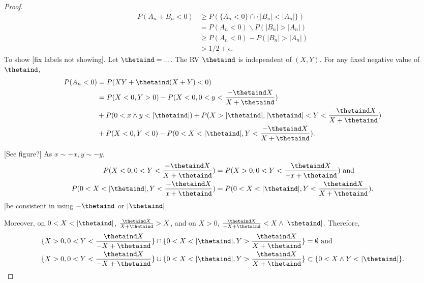 \documentclass[12pt]{article}
\renewcommand{\P}{P}
\newcommand{\A}{A}
\newcommand{\B}{B}
\newcommand{\y}{Y}
\newcommand{\x}{X}
\begin{document}
{\begin{proof}
      \begin{align}
        \P(A_n+B_n < 0) &\ge \P(\{\A_n<0\} \cap \{|B_n|<|A_n|\})\\
                        &=\P(\A_n <0) \backslash \P(|\B_n|>|\A_n|)\\
                        &\ge \P(\A_n<0) - \P(|\B_n|>|\A_n|)\\
                        &> 1/2 + \epsilon.
      \end{align}
      To show  [fix labels not showing]. Let
      $\thetaind=...$. The RV $\thetaind$ is independent of
      $(\x,\y)$. For any fixed negative value of $\thetaind$,
      \begin{align}
        \P(\A_n<0) &= \P(\x\y+\thetaind(\x+\y) < 0)\\
                   &= \P(\x < 0, \y > 0) - \P(\x<0, 0<y<\frac{-\thetaind \x}{\x+\thetaind})\\
                   &+ \P(0 < x \wedge y < |\thetaind|) + \P(\x > |\thetaind|, |\thetaind| < \y < \frac{-\thetaind\x}{\x+\thetaind})\\
                   &+ \P(\x < 0, \y < 0) - \P(0 < \x < |\thetaind|, \y < \frac{-\thetaind\x}{\x+\thetaind}).\label{thrm:sign:Adecomposition}
      \end{align}
      
      [See figure?] As $x\sim -x, y\sim -y$,
      \begin{align}
        \P(\x<0, 0 < \y < \frac{-\thetaind\x}{\x+\thetaind}) &= \P(\x>0, 0 < \y < \frac{\thetaind\x}{-x+\thetaind}) \text{   and    }\\
        \P(0<\x<|\thetaind|, \y < \frac{-\thetaind\x}{x+\thetaind}) &= \P(0 < \x < |\thetaind|, \y < \frac{\thetaind\x}{\x+\thetaind}).
      \end{align}
      [be consistent in using $-\thetaind$ or $|\thetaind|$].

      Moreover, on $0 < \x < |\thetaind|$,
      $\frac{\thetaind\x}{\x+\thetaind} > \x$, and on $\x>0$,
      $\frac{\thetaind\x}{-\x+\thetaind} < \x \wedge |\thetaind|$. Therefore,
      \begin{align}
        \{\x > 0, 0 < \y < \frac{\thetaind\x}{-\x+\thetaind}\} \cap \{0<\x<|\thetaind|, \y>\frac{\thetaind\x}{\x+\thetaind}\} &= \emptyset \text{   and   }\\
        \{\x > 0, 0 < \y < \frac{\thetaind\x}{-\x+\thetaind}\} \cup \{0<\x<|\thetaind|, \y>\frac{\thetaind\x}{\x+\thetaind}\} &\subset \{0< \x\wedge\y < |\thetaind|\}.\label{thrm:sign:switchedregions}
      \end{align}


\end{proof}}
\end{document}
